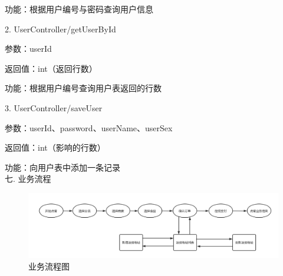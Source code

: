 功能：根据用户编号与密码查询用户信息

2. UserController/getUserById 

参数：userId 

返回值：int（返回行数）

功能：根据用户编号查询用户表返回的行数

3. UserController/saveUser 

参数：userId、password、userName、userSex

返回值：int（影响的行数）

功能：向用户表中添加一条记录~\\

\noindent
七. 业务流程

\begin{figure}[H]
    \centering
    \includegraphics[scale=0.45]{figures/flowchart.png}
    \caption{业务流程图}
\end{figure}

